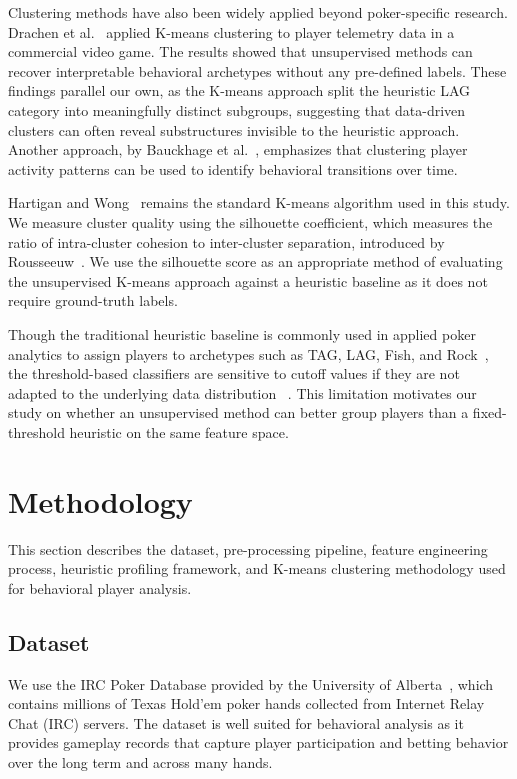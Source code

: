\documentclass[sigconf]{acmart}
\begin{document}
Clustering methods have also been widely applied beyond poker-specific research. Drachen et al.~\cite{drachen2012guns} applied K-means clustering to player telemetry data in a commercial video game. The results showed that unsupervised methods can recover interpretable behavioral archetypes without any pre-defined labels. These findings parallel our own, as the K-means approach split the heuristic LAG category into meaningfully distinct subgroups, suggesting that data-driven clusters can often reveal substructures invisible to the heuristic approach. Another approach, by Bauckhage et al.~\cite{bauckhage2012players}, emphasizes that clustering player activity patterns can be used to identify behavioral transitions over time. 

Hartigan and Wong~\cite{hartigan1979kmeans} remains the standard K-means algorithm used in this study. We measure cluster quality using the silhouette coefficient, which measures the ratio of intra-cluster cohesion to inter-cluster separation, introduced by Rousseeuw~\cite{rousseeuw1987silhouettes}. We use the silhouette score as an appropriate method of evaluating the unsupervised K-means approach against a heuristic baseline as it does not require ground-truth labels. 

Though the traditional heuristic baseline is commonly used in applied poker analytics to assign players to archetypes such as TAG, LAG, Fish, and Rock~\cite{billings2002challenge}, the threshold-based classifiers are sensitive to cutoff values if they are not adapted to the underlying data distribution ~\cite{fernandez2016generic}. This limitation motivates our study on whether an unsupervised method can better group players than a fixed-threshold heuristic on the same feature space.

\section{Methodology}
This section describes the dataset, pre-processing pipeline, feature engineering process, heuristic profiling framework, and K-means clustering methodology used for behavioral player analysis.

\subsection{Dataset}
We use the IRC Poker Database provided by the University of Alberta~\cite{irc_poker_dataset}, which contains millions of Texas Hold’em poker hands collected from Internet Relay Chat (IRC) servers. The dataset is well suited for behavioral analysis as it provides gameplay records that capture player participation and betting behavior over the long term and across many hands. 
\end{document}
